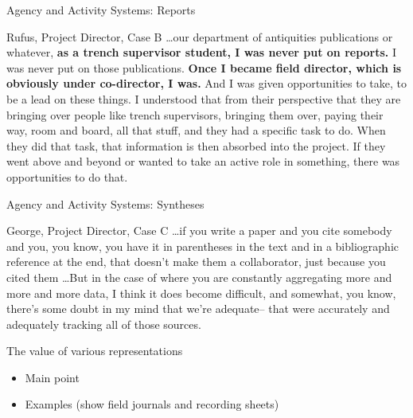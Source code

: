 \documentclass{beamer}
\begin{document}
\begin{frame}{Agency and Activity Systems: Reports}

  \begin{block}{Rufus, Project Director, Case B}
    \dots our department of antiquities publications or whatever, \textbf{as a trench supervisor student, I was never put on reports.} I was never put on those publications. \textbf{Once I became field director, which is obviously under co-director, I was.} And I was given opportunities to take, to be a lead on these things. I understood that from their perspective that \alert{they are bringing over people like trench supervisors, bringing them over, paying their way, room and board, all that stuff, and they had a specific task to do. When they did that task, that information is then absorbed into the project.} If they went above and beyond or wanted to take an active role in something, there was opportunities to do that.
  \end{block}

\end{frame}

\begin{frame}{Agency and Activity Systems: Syntheses}

  \begin{block}{George, Project Director, Case C}
    \dots if you write a paper and you cite somebody and you, you know, you have it in parentheses in the text and in a bibliographic reference at the end, that doesn’t make them a collaborator, just because you cited them \dots But in the case of where you are constantly aggregating more and more and more data, I think it does become difficult, and somewhat, you know, there’s some doubt in my mind that we’re adequate– that were accurately and adequately tracking all of those sources.
  \end{block}

\end{frame}

\begin{frame}{The value of various representations}
  \begin{itemize}
    \item Main point
    \item Examples (show field journals and recording sheets)
  \end{itemize}
\end{frame}
\end{document}
